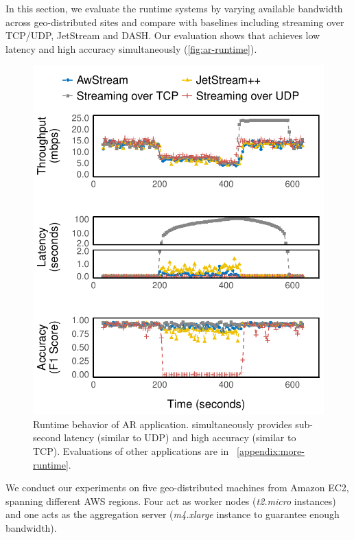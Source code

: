 In this section, we evaluate the runtime systems by varying available bandwidth
across geo-distributed sites and compare \sysname{} with baselines including
streaming over TCP/UDP, JetStream and DASH. Our evaluation shows that \sysname{}
achieves low latency and high accuracy simultaneously
(\autoref{fig:ar-runtime}).

\begin{figure}
  \centering
  \includegraphics[width=\columnwidth]{figures/runtime-darknet-verticle.pdf}
  \caption{Runtime behavior of AR application. \sysname{} simultaneously
    provides sub-second latency (similar to UDP) and high accuracy (similar to
    TCP). Evaluations of other applications are in \
    \autoref{appendix:more-runtime}. }
  \label{fig:ar-runtime}
\end{figure}

 We conduct our experiments on five geo-distributed
machines from Amazon EC2, spanning different AWS regions. Four act as worker
nodes (\textit{t2.micro} instances) and one acts as the aggregation server
(\textit{m4.xlarge} instance to guarantee enough bandwidth).

